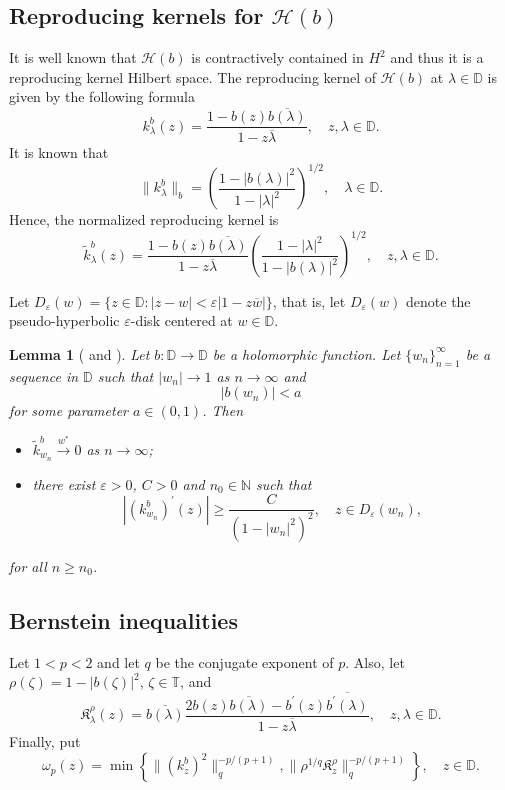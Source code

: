 \documentclass{amsart}
\numberwithin{equation}{section}
\newtheorem{lemma}[theorem]{Lemma}
\theoremstyle{definition}
\newcommand{\dbr}{\mathcal{H}}
\newcommand{\er}{\varepsilon}
\newcommand{\za}{\zeta}
\newcommand{\om}{\omega}
\newcommand{\Dbb}{\mathbb D}
\newcommand{\Tbb}{\mathbb T}
\newcommand{\knl}{k}
\newcommand{\Nbb}{\mathbb N}
\begin{document}
%
\subsection{Reproducing kernels for $\dbr(b)$}
It is well known that $\dbr(b)$ is contractively contained in $H^2$ and thus it is a reproducing kernel Hilbert space. The reproducing kernel of $\dbr(b)$ at $\lambda\in \Dbb$ is given by the following formula
\[
k^b_\lambda (z) =
\frac{1-b(z) \overline{b(\lambda)}}{1- z\overline{\lambda}}, \quad
z, \lambda \in \Dbb.
\]
It is known that
\[
\|k^b_\lambda\|_b = \left(\frac{1- |b(\lambda)|^2}{1-|\lambda|^2}\right)^{1/2}, \quad
\lambda \in \Dbb.
\] 
Hence, the normalized reproducing kernel is
\[
\widetilde{k}^b_\lambda (z) =
\frac{1-b(z) \overline{b(\lambda)}}{1- z\overline{\lambda}} \left(\frac{1-|\lambda|^2}{1- |b(\lambda)|^2}\right)^{1/2}, \quad
z, \lambda \in \Dbb.
\]

Let $D_\er(w) = \{z\in\Dbb: |z-w| < \er|1- z\overline{w}|\}$, that is,
let $D_\er(w)$ denote the pseudo-hyperbolic $\er$-disk centered at  $w\in \Dbb$.

\begin{lemma}[{\cite[Lemma~1]{LM13} and \cite[Lemma~8]{FKM19}}]\label{l_LM}
Let $b: \Dbb \to\Dbb$ be a holomorphic function.
Let $\{w_n\}_{n=1}^\infty$ be a sequence in $\Dbb$ such that $|w_n|\to 1$ as $n\to \infty$ and
\begin{equation}\label{e_LM}
|b (w_n)| < a
\end{equation}
for some parameter $a\in (0,1)$. Then
\begin{itemize}
\item[(i)] $\widetilde{\knl}_{w_n}^b \overset{w^\ast}\longrightarrow 0$ as $n\to \infty$;
\item[(ii)] there exist $\er>0$, $C>0$ and $n_0\in\Nbb$ such that
\[
|(\knl_{w_n}^b)^\prime(z)| \ge \frac{C}{(1-|w_n|^2)^2}, \quad z\in D_\er(w_n),
\]
\end{itemize}
for all $n\ge n_0$.
\end{lemma}

\subsection{Bernstein inequalities}
Let $1 < p < 2$ and let $q$ be the conjugate exponent of $p$. Also, let
$\rho(\za) = 1- |b(\za)|^2$, $\za\in\Tbb$, and
\[
\mathfrak{K}^\rho_\lambda(z) = \overline{b(\lambda)}
\frac{
2 b(z)\overline{b(\lambda)}- b^\prime(z) \overline{b^\prime(\lambda)}}{
1-z\overline{\lambda}}, \quad z, \lambda \in\Dbb. 
\]
Finally, put
\[
\om_p(z) = \min
\left\{
\|(k^b_z)^2\|^{-p/(p+1)}_q, 
\|\rho^{1/q} \mathfrak{K}^\rho_z\|^{-p/(p+1)}_q
\right\}, \quad z\in \Dbb.
\]
\end{document}
